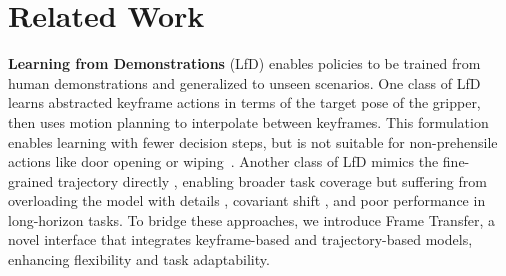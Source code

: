 
\section{Related Work}

\textbf{Learning from Demonstrations} (LfD) enables policies to be trained from human demonstrations and generalized to unseen scenarios. 
One class of LfD learns abstracted keyframe actions \cite{james2022q, james2022coarse, shridhar2023perceiver, gervet2023act3d, goyal2023rvt} in terms of the target pose of the gripper, then uses motion planning to interpolate between keyframes. This formulation enables learning with fewer decision steps, but is not suitable for non-prehensile actions like door opening or wiping~\cite{xian2023chaineddiffuser, ma2024hierarchical}.
Another class of LfD mimics the fine-grained trajectory directly
\cite{song2020grasping, ye2022bagging, toyer2020magical, zhang2018deep, chi2023diffusionpolicy, zhu2023viola, mandlekar2021matters, zhao2023learning, wang2024equivariant}, enabling broader task coverage but suffering from overloading
the model with details \cite{zhao2023learning}, covariant shift \cite{ke2021grasping}, and poor performance in long-horizon tasks. To bridge these approaches, we introduce Frame Transfer, a novel interface that integrates keyframe-based and trajectory-based models, enhancing flexibility and task adaptability.



